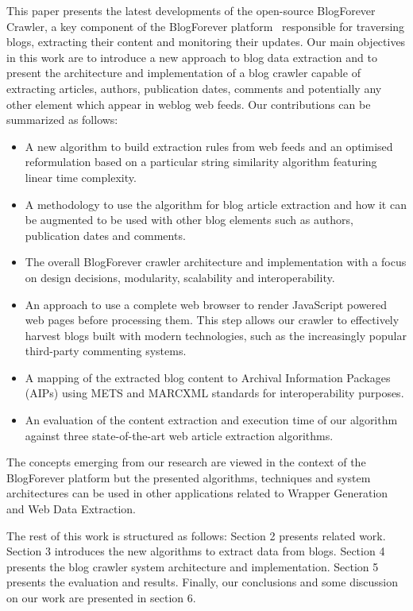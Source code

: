 This paper presents the latest developments of the open-source 
BlogForever Crawler, a key component of the BlogForever 
platform~\cite{kasioumis2013towards} responsible for traversing blogs, 
extracting their content and monitoring their updates. Our main 
objectives in this work are to introduce a new approach to blog data 
extraction and to present the architecture and implementation of a blog 
crawler capable of extracting articles, authors, publication dates, 
comments and potentially any other element which appear in weblog
web feeds. Our contributions can be summarized as follows:

\begin{itemize}
\item 
A new algorithm to build extraction rules from web feeds and an optimised 
reformulation based on a particular string similarity algorithm featuring
linear time complexity.
\item 
A methodology to use the algorithm for blog article extraction and how 
it can be augmented to be used with other blog elements such as authors, 
publication dates and comments.
\item 
The overall BlogForever crawler architecture and implementation with a 
focus on design decisions, modularity, scalability and interoperability.
\item 
An approach to use a complete web browser to render JavaScript powered 
web pages before processing them. This step allows our crawler to 
effectively harvest blogs built with modern technologies, such as 
the increasingly popular third-party commenting systems.
\item 
A mapping of the extracted blog content to Archival Information Packages 
(AIPs) using METS and MARCXML standards for interoperability purposes.
\item 
An evaluation of the content extraction and execution time of our 
algorithm against three state-of-the-art web article extraction algorithms.\\
\end{itemize}

The concepts emerging from our research are viewed in the context of the 
BlogForever platform but the presented algorithms, techniques and system 
architectures can be used in other applications related to Wrapper 
Generation and Web Data Extraction.

The rest of this work is structured as follows: Section 2 presents 
related work. Section 3 introduces the new algorithms to extract data 
from blogs. Section 4 presents the blog crawler system architecture and 
implementation. Section 5 presents the evaluation and results. Finally, 
our conclusions and some discussion on our work are presented in section 6.

